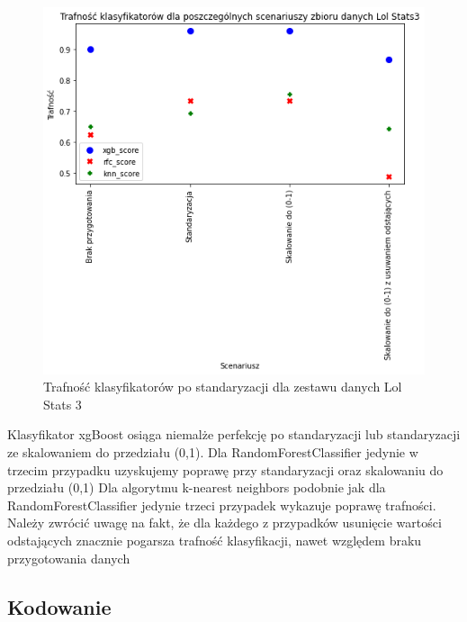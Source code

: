 \documentclass{book}
\begin{document}
\begin{figure}[H]
\centerline{\includegraphics{Lol_Stats_3_Standaryzacja}}
\centering
\caption{Trafność klasyfikatorów po standaryzacji dla zestawu danych Lol Stats 3}
\end{figure}

Klasyfikator xgBoost osiąga niemalże perfekcję po 
standaryzacji lub standaryzacji ze skalowaniem do przedziału (0,1). 
Dla RandomForestClassifier jedynie w trzecim przypadku uzyskujemy poprawę przy 
standaryzacji oraz skalowaniu do przedziału (0,1) 
Dla algorytmu k-nearest neighbors podobnie jak dla RandomForestClassifier jedynie 
trzeci przypadek wykazuje poprawę trafności.
Należy zwrócić uwagę na fakt, że dla każdego z przypadków usunięcie wartości 
odstających znacznie pogarsza trafność klasyfikacji, 
nawet względem braku przygotowania danych

\subsection{Kodowanie}
\end{document}

